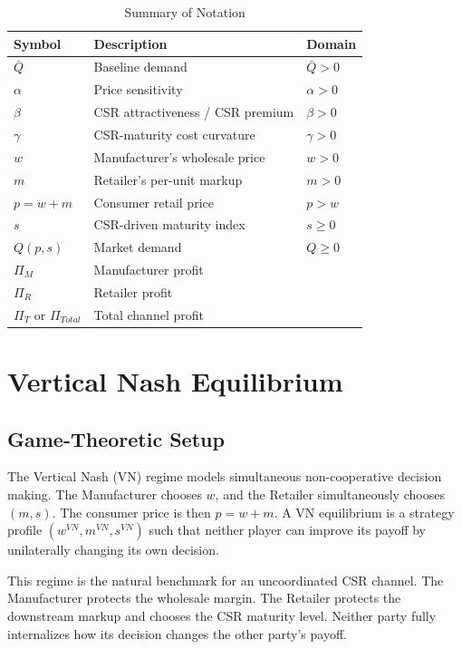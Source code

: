 \begin{table}[htbp]
\centering
\caption{Summary of Notation}
\label{tab:ch3-notation}
\begin{tabular}{lll}
\toprule
\textbf{Symbol} & \textbf{Description} & \textbf{Domain} \\
\midrule
$\bar{Q}$ & Baseline demand & $\bar{Q}>0$ \\
$\alpha$ & Price sensitivity & $\alpha>0$ \\
$\beta$ & CSR attractiveness / CSR premium & $\beta>0$ \\
$\gamma$ & CSR-maturity cost curvature & $\gamma>0$ \\
$w$ & Manufacturer's wholesale price & $w>0$ \\
$m$ & Retailer's per-unit markup & $m>0$ \\
$p=w+m$ & Consumer retail price & $p>w$ \\
$s$ & CSR-driven maturity index & $s\geq 0$ \\
$Q(p,s)$ & Market demand & $Q\geq 0$ \\
$\Pi_M$ & Manufacturer profit & \\
$\Pi_R$ & Retailer profit & \\
$\Pi_T$ or $\Pi_{Total}$ & Total channel profit & \\
\bottomrule
\end{tabular}
\end{table}

\section{Vertical Nash Equilibrium}
\label{sec:vn}

\subsection{Game-Theoretic Setup}

The Vertical Nash (VN) regime models simultaneous non-cooperative decision making. The Manufacturer chooses $w$, and the Retailer simultaneously chooses $(m,s)$. The consumer price is then $p=w+m$. A VN equilibrium is a strategy profile $(w^{VN},m^{VN},s^{VN})$ such that neither player can improve its payoff by unilaterally changing its own decision.

This regime is the natural benchmark for an uncoordinated CSR channel. The Manufacturer protects the wholesale margin. The Retailer protects the downstream markup and chooses the CSR maturity level. Neither party fully internalizes how its decision changes the other party's payoff.

